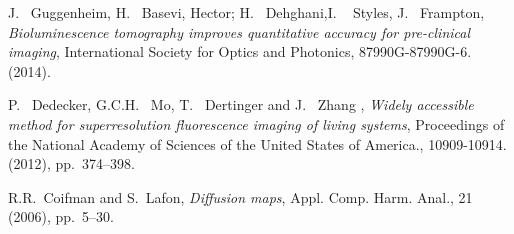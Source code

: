 \documentclass{article}
\begin{document}
\begin{article}





\begin{thebibliography}{3}
J. ~Guggenheim, H. ~Basevi, Hector; H. ~Dehghani,I. ~ Styles, J. ~Frampton, {\em Bioluminescence tomography improves quantitative accuracy for pre-clinical imaging}, International Society for Optics and Photonics, 87990G-87990G-6. (2014).

\bibitem{}
P. ~Dedecker, G.C.H. ~Mo, T. ~Dertinger and J. ~Zhang , {\em Widely accessible method for superresolution fluorescence imaging of living systems}, Proceedings of the National Academy of Sciences of the United States of America., 10909-10914. (2012),
  pp.~374--398.

R.R.~Coifman and S.~Lafon, {\em Diffusion maps}, Appl. Comp. Harm. Anal.,
  21 (2006), pp.~5--30.
\end{thebibliography}


\end{article}

\end{document}
